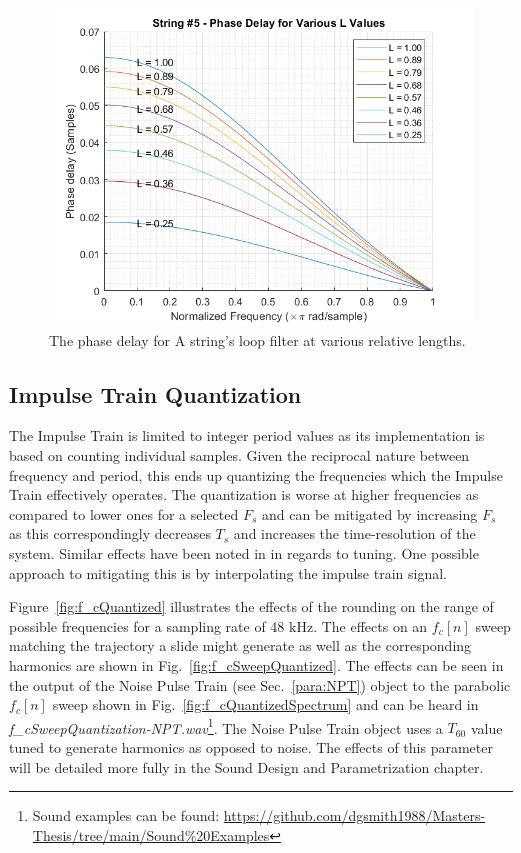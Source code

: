\documentclass[../main.tex]{subfiles}
\begin{document}
\begin{figure}[h]
    \centering
    \includegraphics[scale=.65]{./images/plots/String 5 - Phase Delays.png}
    \caption{The phase delay for A string's loop filter at various relative lengths.}
    \label{fig:Str5PhaseDelays}
\end{figure}

\subsection{Impulse Train Quantization}
The Impulse Train is limited to integer period values as its implementation is based on counting individual samples. Given the reciprocal nature between frequency and period, this ends up quantizing the frequencies which the Impulse Train effectively operates. The quantization is worse at higher frequencies as compared to lower ones for a selected $F_s$ and can be mitigated by increasing $F_s$ as this correspondingly decreases $T_s$ and increases the time-resolution of the system. Similar effects have been noted in  in regards to tuning. One possible approach to mitigating this is by interpolating the impulse train signal.

Figure~\ref{fig:f_cQuantized} illustrates the effects of the rounding on the range of possible frequencies for a sampling rate of 48 kHz. The effects on an $f_c[n]$ sweep matching the trajectory a slide might generate as well as the corresponding harmonics are shown in Fig.~\ref{fig:f_cSweepQuantized}. The effects can be seen in the output of the Noise Pulse Train (see Sec.~\ref{para:NPT}) object to the parabolic $f_c[n]$ sweep shown in Fig.~\ref{fig:f_cQuantizedSpectrum} and can be heard in \emph{f\_cSweepQuantization-NPT.wav}\footnote{Sound examples can be found: \url{https://github.com/dgsmith1988/Masters-Thesis/tree/main/Sound\%20Examples}}. The Noise Pulse Train object uses a $T_{60}$ value tuned to generate harmonics as opposed to noise. The effects of this parameter will be detailed more fully in the Sound Design and Parametrization chapter.
\end{document}
